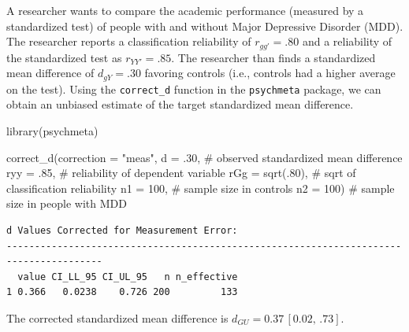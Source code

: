 \documentclass[
  letterpaper,
  DIV=11,
  numbers=noendperiod]{scrreprt}
\newenvironment{Shaded}{}{}
\newcommand{\AttributeTok}[1]{\textcolor[rgb]{0.00,0.34,0.68}{#1}}
\newcommand{\CommentTok}[1]{\textcolor[rgb]{0.54,0.53,0.53}{#1}}
\newcommand{\DecValTok}[1]{\textcolor[rgb]{0.69,0.50,0.00}{#1}}
\newcommand{\FunctionTok}[1]{\textcolor[rgb]{0.39,0.29,0.61}{#1}}
\newcommand{\NormalTok}[1]{\textcolor[rgb]{0.12,0.11,0.11}{#1}}
\newcommand{\StringTok}[1]{\textcolor[rgb]{0.75,0.01,0.01}{#1}}
\begin{document}
\begin{tcolorbox}[enhanced jigsaw, toptitle=1mm, titlerule=0mm, arc=.35mm, breakable, colframe=quarto-callout-note-color-frame, title={Applied Example in R}, opacitybacktitle=0.6, opacityback=0, colbacktitle=quarto-callout-note-color!10!white, coltitle=black, bottomtitle=1mm, colback=white, bottomrule=.15mm, rightrule=.15mm, toprule=.15mm, leftrule=.75mm, left=2mm]

A researcher wants to compare the academic performance (measured by a
standardized test) of people with and without Major Depressive Disorder
(MDD). The researcher reports a classification reliability of
\(r_{gg'}=.80\) and a reliability of the standardized test as
\(r_{YY'}=.85\). The researcher than finds a standardized mean
difference of \(d_{gY}=.30\) favoring controls (i.e., controls had a
higher average on the test). Using the \texttt{correct\_d} function in
the \texttt{psychmeta} package, we can obtain an unbiased estimate of
the target standardized mean difference.

\begin{Shaded}
\begin{Highlighting}[]
\FunctionTok{library}\NormalTok{(psychmeta)}

\FunctionTok{correct\_d}\NormalTok{(}\AttributeTok{correction =} \StringTok{"meas"}\NormalTok{,}
          \AttributeTok{d =}\NormalTok{ .}\DecValTok{30}\NormalTok{,   }\CommentTok{\# observed standardized mean difference}
          \AttributeTok{ryy =}\NormalTok{ .}\DecValTok{85}\NormalTok{, }\CommentTok{\# reliability of dependent variable}
          \AttributeTok{rGg =} \FunctionTok{sqrt}\NormalTok{(.}\DecValTok{80}\NormalTok{), }\CommentTok{\# sqrt of classification reliability}
          \AttributeTok{n1 =} \DecValTok{100}\NormalTok{, }\CommentTok{\# sample size in controls}
          \AttributeTok{n2 =} \DecValTok{100}\NormalTok{) }\CommentTok{\# sample size in people with MDD}
\end{Highlighting}
\end{Shaded}

\begin{verbatim}
d Values Corrected for Measurement Error:
---------------------------------------------------------------------------------------
  value CI_LL_95 CI_UL_95   n n_effective
1 0.366   0.0238    0.726 200         133
\end{verbatim}

The corrected standardized mean difference is
\(d_{GU}=0.37\, [0.02,\, .73]\).

\end{tcolorbox}
\end{document}
